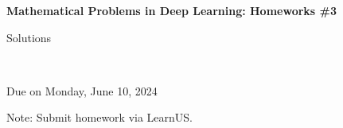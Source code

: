 \documentclass[12pt]{article}
\begin{document}
\begin{center}
{\bf Mathematical Problems in Deep Learning: Homeworks \#3 \begin{solution}Solutions\end{solution}}\\ \medskip
\begin{problem}Due on Monday, June 10, 2024 \end{problem}
\end{center}

\begin{problem}
\noindent 
Note: Submit homework via LearnUS.
\end{problem}

\begin{solution}
\end{solution}
\end{document}
